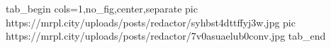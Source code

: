  
 
 
 
 

\ifcmt
  tab_begin cols=1,no_fig,center,separate
     pic https://mrpl.city/uploads/posts/redactor/syhbst4dttffyj3w.jpg
     pic https://mrpl.city/uploads/posts/redactor/7v0asuaelub0conv.jpg
  tab_end
\fi
